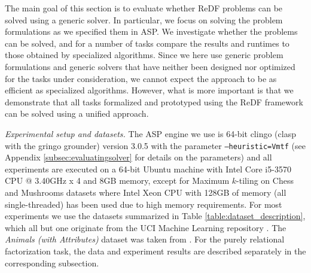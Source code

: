 
\begin{table}[b]
 \caption{Dataset properties. For each dataset,  we specify whether the attributes have Boolean or categorical domains, the number of tuples and attributes, and the average number of distinct values per attribute}
 \label{table:dataset_description}
\end{table}

The main goal of this section is to evaluate whether ReDF problems can be solved using a generic solver. In particular, we focus on solving the problem formulations as we specified them in ASP. We investigate whether the problems can be solved, and for a number of tasks compare the results and runtimes to those obtained by specialized algorithms. Since we here use generic problem formulations and generic solvers that have neither been designed nor optimized for the tasks under consideration, we cannot expect the approach to be as efficient as specialized algorithms. However, what is more important is that we demonstrate that all tasks formalized and prototyped using the ReDF framework can be solved using a unified approach.


\textit{Experimental setup and datasets.} The ASP engine we use is 64-bit clingo (clasp with the gringo grounder) version 3.0.5 with the parameter \texttt{--heuristic=Vmtf} (see Appendix \ref{subsec:evaluatingsolver} for details on the parameters) and all experiments are executed on a 64-bit Ubuntu machine with Intel Core i5-3570 CPU @ 3.40GHz x 4 and 8GB memory, except for Maximum $k$-tiling on Chess and Mushrooms datasets where Intel Xeon CPU with 128GB of memory (all single-threaded) has been used due to high memory requirements. For most experiments we use the datasets summarized in Table \ref{table:dataset_description}, which all but one originate from the UCI Machine Learning repository \parencite{ucidatasets}. The \emph{Animals (with Attributes)} dataset was taken from \cite{animalDataset}. For the purely relational factorization task, the data and experiment results are described separately in the corresponding subsection. 

